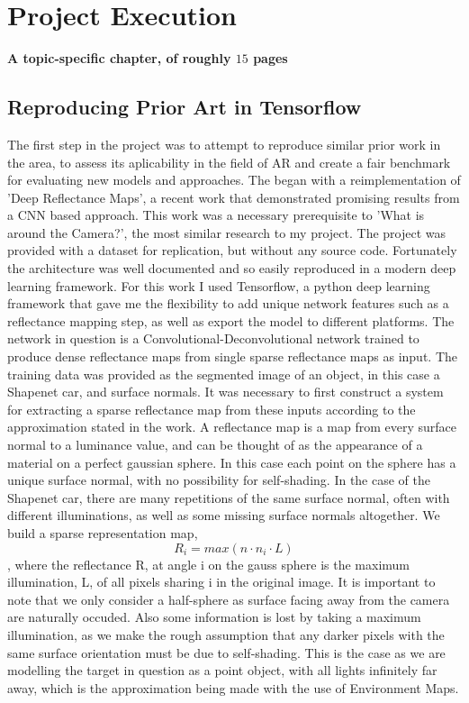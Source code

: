 \documentclass[ %
                    author={Gavin Parker},
                supervisor={Dr. Neill Campbell},
                    degree={MEng},
                     title={Deep Siamese Networks for Illumination Estimation from Stereo Images},
                  subtitle={},
                      type={research},
                      year={2018} ]{dissertation}
\begin{document}

\chapter{Project Execution}
\label{chap:execution}

{\bf A topic-specific chapter, of roughly $15$ pages} 
\vspace{1cm} 

\section{Reproducing Prior Art in Tensorflow}
The first step in the project was to attempt to reproduce similar prior work in the area, to assess its aplicability in the field of AR and create a fair benchmark for evaluating new models and approaches. The began with a reimplementation of 'Deep Reflectance Maps', a recent work that demonstrated promising results from a CNN based approach. This work was a necessary prerequisite to 'What is around the Camera?', the most similar research to my project. The project was provided with a dataset for replication, but without any source code. Fortunately the architecture was well documented and so easily reproduced in a modern deep learning framework. For this work I used Tensorflow, a python deep learning framework that gave me the flexibility to add unique network features such as a reflectance mapping step, as well as export the model to different platforms.
\newline
The network in question is a Convolutional-Deconvolutional network trained to produce dense reflectance maps from single sparse reflectance maps as input. The training data was provided as the segmented image of an object, in this case a Shapenet car, and surface normals. It was necessary to first construct a system for extracting a sparse reflectance map from these inputs according to the approximation stated in the work. A reflectance map is a map from every surface normal to a luminance value, and can be thought of as the appearance of a material on a perfect gaussian sphere. In this case each point on the sphere has a unique surface normal, with no possibility for self-shading. In the case of the Shapenet car, there are many repetitions of the same surface normal, often with different illuminations, as well as some missing surface normals altogether. We build a sparse representation map,
\[ R_i = max(n\cdot n_i \cdot L)\],
where the reflectance R, at angle i on the gauss sphere is the maximum illumination, L, of all pixels sharing i in the original image. It is important to note that we only consider a half-sphere as surface facing away from the camera are naturally occuded. Also some information is lost by taking a maximum illumination, as we make the rough assumption that any darker pixels with the same surface orientation must be due to self-shading. This is the case as we are modelling the target in question as a point object, with all lights infinitely far away, which is the approximation being made with the use of Environment Maps.
\end{document}
